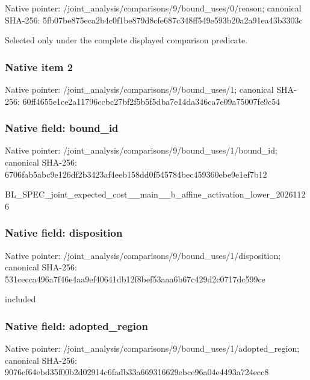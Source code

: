 \documentclass[10pt,a4paper]{article}
\begin{document}
Native pointer: /joint\_analysis/comparis\allowbreak{}ons/9/bound\_uses/0/reaso\allowbreak{}n; canonical SHA-256: 5fb07be875eca2b4c0f1be87\allowbreak{}9d8cfe687c348ff549e593b2\allowbreak{}0a2a91ea43b3303c


Selected only under the complete displayed comparison predicate.


\subsubsection{Native item 2}


Native pointer: /joint\_analysis/comparis\allowbreak{}ons/9/bound\_uses/1; canonical SHA-256: 60ff4655e1ce2a11796ccbc2\allowbreak{}7bf2f5b5f5dba7e14da346ca\allowbreak{}7e09a75007fe9c54



\subsubsection{Native field: bound\_id}


Native pointer: /joint\_analysis/comparis\allowbreak{}ons/9/bound\_uses/1/bound\allowbreak{}\_id; canonical SHA-256: 6706fab5abc9e126df2b3423\allowbreak{}af4eeb158dd0f545784bec45\allowbreak{}9360ebe9e1ef7b12


BL\_SPEC\_joint\_expected\_c\allowbreak{}ost\_\_main\_\_b\_affine\_acti\allowbreak{}vation\_lower\_20261126


\subsubsection{Native field: disposition}


Native pointer: /joint\_analysis/comparis\allowbreak{}ons/9/bound\_uses/1/dispo\allowbreak{}sition; canonical SHA-256: 531cecca496a7f46e4aa9ef4\allowbreak{}0641db12f8bef53aaa6b67c4\allowbreak{}29d2c0717dc599ce


included


\subsubsection{Native field: adopted\_region}


Native pointer: /joint\_analysis/comparis\allowbreak{}ons/9/bound\_uses/1/adopt\allowbreak{}ed\_region; canonical SHA-256: 9076ef64ebd35f00b2d02914\allowbreak{}c6fadb33a669316629ebce96\allowbreak{}a04e4493a724ecc8
\end{document}
